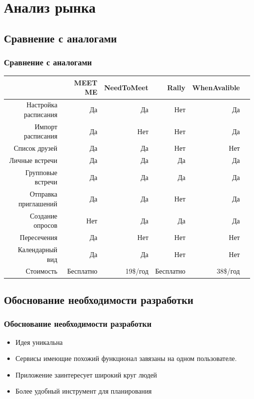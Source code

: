 \documentclass[aspectratio=169]{beamer}
\begin{document}
\section{Анализ рынка}

\subsection{Сравнение с аналогами}
\begin{frame}
    \frametitle{Сравнение с аналогами}
    
    
    \begin{table} 
    \begin{tabular}{r | r r r r r} 
              & MEET ME &  NeedToMeet &  Rally & WhenAvalible \\ \hline
             Настройка расписания    & Да  & Да  & Нет & Да \\
             Импорт расписания       & Да  & Нет & Нет & Да \\
             Список друзей           & Да  & Да  & Нет & Нет \\
             Личные встречи          & Да  & Да  & Да  & Да \\
             Групповые встречи       & Да  & Да  & Да  & Да \\
             Отправка приглашений    & Да  & Да  & Нет & Да \\
             Создание опросов        & Нет & Да  & Да  & Да \\
             Пересечения & Да  & Нет & Нет & Нет \\
             Календарный вид         & Да  & Да  & Нет & Нет \\
             Стоимость               & Бесплатно & 19\$/год & Бесплатно & 38\$/год \\
    \end{tabular} 
    \end{table}
    \end{frame}

\subsection{Обоснование необходимости разработки}
\begin{frame}
\frametitle{Обоснование необходимости разработки}

\begin{itemize}
    \item Идея уникальна 
    \item Сервисы имеющие похожий функционал завязаны на одном пользователе.
    \item Приложение заинтересует широкий круг людей
    \item Более удобный инструмент для планирования
\end{itemize}
\end{frame}
\end{document}
